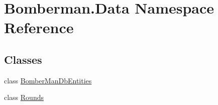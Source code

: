 \hypertarget{namespace_bomberman_1_1_data}{}\section{Bomberman.\+Data Namespace Reference}
\label{namespace_bomberman_1_1_data}
\subsection*{Classes}
\begin{DoxyCompactItemize}
\item 
class \mbox{\hyperlink{class_bomberman_1_1_data_1_1_bomber_man_db_entities}{Bomber\+Man\+Db\+Entities}}
\item 
class \mbox{\hyperlink{class_bomberman_1_1_data_1_1_rounds}{Rounds}}
\end{DoxyCompactItemize}
